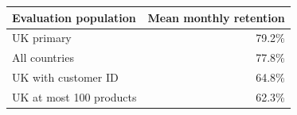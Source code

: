 \begin{tabular}{lr}
\toprule
Evaluation population & Mean monthly retention \\
\midrule
UK primary & 79.2\% \\
All countries & 77.8\% \\
UK with customer ID & 64.8\% \\
UK at most 100 products & 62.3\% \\
\bottomrule
\end{tabular}
